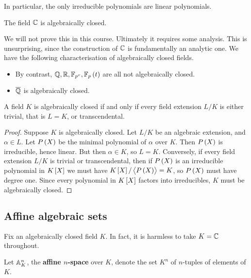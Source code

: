 In particular, the only irreducible polynomials are linear polynomials.

\begin{theorem}
The field $ \CC $ is algebraically closed.
\end{theorem}

We will not prove this in this course. Ultimately it requires some analysis. This is unsurprising, since the construction of $ \CC $ is fundamentally an analytic one. We have the following characterisation of algebraically closed fields.

\begin{example*}
\hfill
\begin{itemize}
\item By contrast, $ \QQ, \RR, \FF_{p^r}, \FF_p\br{t} $ are all not algebraically closed.
\item $ \overline{\QQ} $ is algebraically closed.
\end{itemize}
\end{example*}

\begin{lemma}
A field $ K $ is algebraically closed if and only if every field extension $ L / K $ is either trivial, that is $ L = K $, or transcendental.
\end{lemma}

\begin{proof}
Suppose $ K $ is algebraically closed. Let $ L / K $ be an algebraic extension, and $ \alpha \in L $. Let $ P\br{X} $ be the minimal polynomial of $ \alpha $ over $ K $. Then $ P\br{X} $ is irreducible, hence linear. But then $ \alpha \in K $, so $ L = K $. Conversely, if every field extension $ L / K $ is trivial or transcendental, then if $ P\br{X} $ is an irreducible polynomial in $ K\sbr{X} $ we must have $ K\sbr{X} / \abr{P\br{X}} = K $, so $ P\br{X} $ must have degree one. Since every polynomial in $ K\sbr{X} $ factors into irreducibles, $ K $ must be algebraically closed.
\end{proof}

\subsection{Affine algebraic sets}

Fix an algebraically closed field $ K $. In fact, it is harmless to take $ K = \CC $ throughout.

\begin{definition}
Let $ \AA_K^n $, the \textbf{affine $ n $-space} over $ K $, denote the set $ K^n $ of $ n $-tuples of elements of $ K $.
\end{definition}

